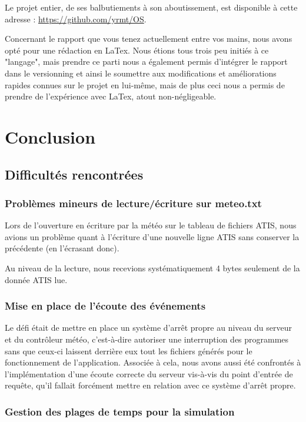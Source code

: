 \documentclass{report}
\begin{document}
{		Le projet entier, de ses balbutiements à son aboutissement, est disponible à cette adresse : \color{blue}\url{https://github.com/yrmt/OS}\color{black}.

		Concernant le rapport que vous tenez actuellement entre vos mains, nous avons opté pour une rédaction en LaTex.
		Nous étions tous trois peu initiés à ce "langage", mais prendre ce parti nous a également permis d’intégrer le rapport
		dans le versionning et ainsi le soumettre aux modifications et améliorations rapides connues sur le projet en lui-même, mais de plus
		ceci nous a permis de prendre de l'expérience avec LaTex, atout non-négligeable.

\chapter{Conclusion}
	
	\section{Difficultés rencontrées}

		\subsection{Problèmes mineurs de lecture/écriture sur meteo.txt}

			Lors de l'ouverture en écriture par la météo sur le tableau de fichiers ATIS, nous avions un problème quant à l'écriture d'une nouvelle ligne ATIS sans conserver la précédente (en l'écrasant donc).

			Au niveau de la lecture, nous recevions systématiquement 4 bytes seulement de la donnée ATIS lue.

		\subsection{Mise en place de l'écoute des événements}

			Le défi était de mettre en place un système d'arrêt propre au niveau du serveur et du contrôleur météo, c'est-à-dire autoriser une interruption des programmes sans que ceux-ci laissent derrière eux tout les fichiers générés pour le fonctionnement de l'application.
			Associée à cela, nous avons aussi été confrontés à l'implémentation d'une écoute correcte du serveur vis-à-vis du point d'entrée de requête, qu'il fallait forcément mettre en relation avec ce système d'arrêt propre.


		\subsection{Gestion des plages de temps pour la simulation}

}
\end{document}

